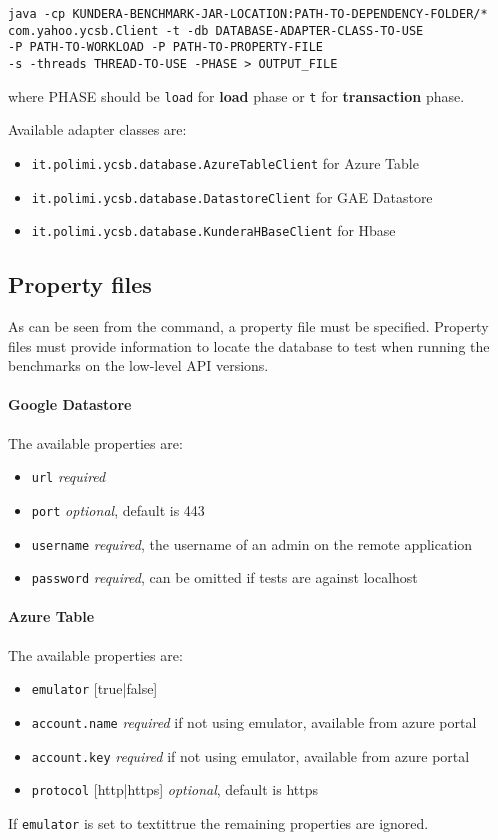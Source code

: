\begin{verbatim}
java -cp KUNDERA-BENCHMARK-JAR-LOCATION:PATH-TO-DEPENDENCY-FOLDER/*
com.yahoo.ycsb.Client -t -db DATABASE-ADAPTER-CLASS-TO-USE
-P PATH-TO-WORKLOAD -P PATH-TO-PROPERTY-FILE 
-s -threads THREAD-TO-USE -PHASE > OUTPUT_FILE
\end{verbatim}

\noindent where PHASE should be \texttt{load} for \textbf{load} phase or \texttt{t} for \textbf{transaction} phase.

\newparagraph  Available adapter classes are:
\begin{itemize}
\item \texttt{it.polimi.ycsb.database.AzureTableClient} for Azure Table
\item \texttt{it.polimi.ycsb.database.DatastoreClient} for GAE Datastore
\item \texttt{it.polimi.ycsb.database.KunderaHBaseClient} for Hbase
\end{itemize}

\subsection{Property files}
As can be seen from the command, a property file must be specified. Property files must provide information to locate the database to test when running the benchmarks on the low-level API versions.

\paragraph{Google Datastore} The available properties are:
\begin{itemize}
\item \texttt{url} \textit{required}
\item \texttt{port} \textit{optional}, default is 443
\item \texttt{username} \textit{required}, the username of an admin on the remote application
\item \texttt{password} \textit{required}, can be omitted if tests are against localhost
\end{itemize}

\paragraph{Azure Table} The available properties are:
\begin{itemize}
\item \texttt{emulator} [true|false]
\item \texttt{account.name} \textit{required} if not using emulator, available from azure portal
\item \texttt{account.key} \textit{required} if not using emulator, available from azure portal
\item \texttt{protocol} [http|https] \textit{optional}, default is https
\end{itemize}
\noindent If \texttt{emulator} is set to textit{true} the remaining properties are ignored.

